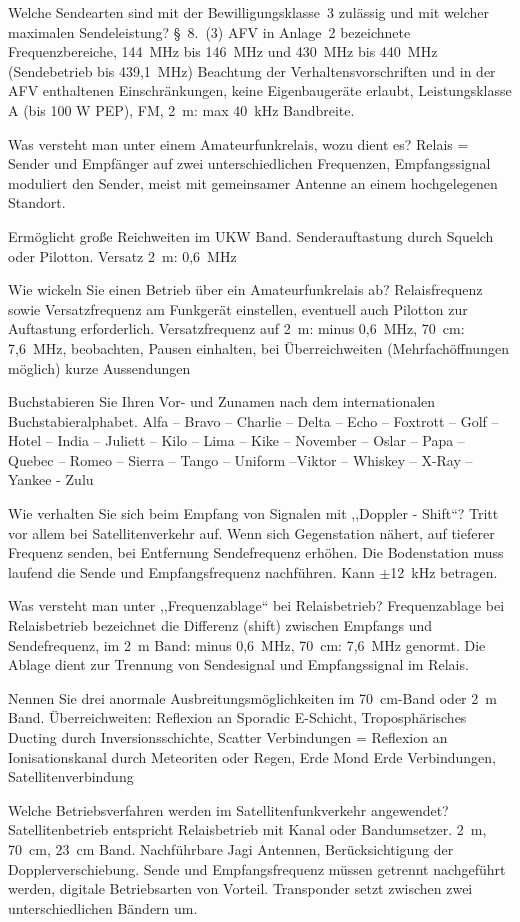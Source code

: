 \documentclass[avery5371,grid,frame,a4paper]{flashcards}
\newcommand{\card}[3]{
  \begin{flashcard}[{\chap} -- #1]{#2}#3\end{flashcard}
}
\begin{document}
\card{10}{Welche Sendearten sind mit der Bewilligungsklasse~3 zulässig und mit welcher maximalen Sendeleistung?}{
  §~8.~(3) AFV in Anlage~2 bezeichnete Frequenzbereiche, 144~MHz bis 146~MHz und 430~MHz bis 440~MHz (Sendebetrieb bis 439,1~MHz) Beachtung der Verhaltensvorschriften und in der AFV enthaltenen Einschränkungen, keine Eigenbaugeräte erlaubt, Leistungsklasse A (bis 100 W PEP), FM, 2~m: max 40~kHz Bandbreite.
}
\card{11}{Was versteht man unter einem Amateurfunkrelais, wozu dient es?}{
  Relais = Sender und Empfänger auf zwei unterschiedlichen Frequenzen, Empfangssignal moduliert den Sender, meist mit gemeinsamer Antenne an einem hochgelegenen Standort.

  Ermöglicht große Reichweiten im UKW Band.
  Senderauftastung durch Squelch oder Pilotton.
  Versatz 2~m: 0,6~MHz
}
\card{12}{Wie wickeln Sie einen Betrieb über ein Amateurfunkrelais ab?}{
  Relaisfrequenz sowie Versatzfrequenz am Funkgerät einstellen, eventuell auch Pilotton zur Auftastung  erforderlich. Versatzfrequenz auf 2~m: minus 0,6~MHz, 70~cm: 7,6~MHz, beobachten, Pausen einhalten, bei Überreichweiten (Mehrfachöffnungen möglich) kurze Aussendungen
}
\card{13}{Buchstabieren Sie Ihren Vor- und Zunamen nach dem internationalen Buchstabieralphabet.}{
  Alfa – Bravo – Charlie – Delta – Echo – Foxtrott – Golf – Hotel – India – Juliett – Kilo – Lima – Kike – November – Oslar – Papa – Quebec – Romeo – Sierra – Tango – Uniform –Viktor – Whiskey – X-Ray – Yankee - Zulu
}
\card{14}{Wie verhalten Sie sich beim Empfang von Signalen mit ,,Doppler - Shift``?}{
  Tritt vor allem bei Satellitenverkehr auf. Wenn sich Gegenstation nähert, auf tieferer Frequenz senden, bei Entfernung Sendefrequenz erhöhen. Die Bodenstation muss laufend die Sende und Empfangsfrequenz      nachführen. Kann $\pm$12~kHz betragen.
}
\card{15}{Was versteht man unter ,,Frequenzablage`` bei Relaisbetrieb?}{
  Frequenzablage bei Relaisbetrieb bezeichnet die Differenz (shift) zwischen Empfangs und Sendefrequenz, im 2~m Band: minus 0,6~MHz, 70~cm: 7,6~MHz genormt. Die Ablage dient zur Trennung von Sendesignal und Empfangssignal im Relais.
}
\card{16}{Nennen Sie drei anormale Ausbreitungsmöglichkeiten im 70~cm-Band oder 2~m Band.}{
  Überreichweiten: Reflexion an Sporadic E-Schicht, Troposphärisches Ducting durch Inversionsschichte, Scatter Verbindungen = Reflexion an Ionisationskanal durch Meteoriten oder Regen, Erde Mond Erde Verbindungen, Satellitenverbindung
}
\card{17}{Welche Betriebsverfahren werden im Satellitenfunkverkehr angewendet?}{
  Satellitenbetrieb entspricht Relaisbetrieb mit Kanal oder Bandumsetzer. 2~m, 70~cm, 23~cm Band. Nachführbare Jagi Antennen, Berücksichtigung der Dopplerverschiebung. Sende und Empfangsfrequenz müssen getrennt nachgeführt werden, digitale Betriebsarten von Vorteil. Transponder setzt zwischen zwei unterschiedlichen Bändern um.
}
\end{document}
